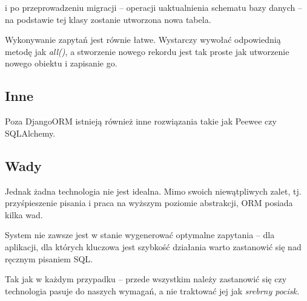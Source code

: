 i po przeprowadzeniu migracji -- operacji uaktualnienia schematu bazy danych -- na podstawie tej klasy zostanie utworzona nowa tabela.

Wykonywanie zapytań jest równie łatwe.
Wystarczy wywołać odpowiednią metodę jak \textit{all()}, a stworzenie nowego rekordu jest tak proste jak utworzenie nowego obiektu i zapisanie go.

\subsection{Inne}
Poza DjangoORM istnieją również inne rozwiązania takie jak Peewee czy SQLAlchemy.

\subsection{Wady}
Jednak żadna technologia nie jest idealna.
Mimo swoich niewątpliwych zalet, tj. przyśpieszenie pisania i praca na wyższym poziomie abstrakcji, ORM posiada kilka wad.

System nie zawsze jest w stanie wygenerować optymalne zapytania -- dla aplikacji, dla których kluczowa jest szybkość działania warto zastanowić się nad ręcznym pisaniem SQL.

Tak jak w każdym przypadku -- przede wszystkim należy zastanowić się czy technologia pasuje do naszych wymagań, a nie traktować jej jak \textit{srebrny pocisk.}